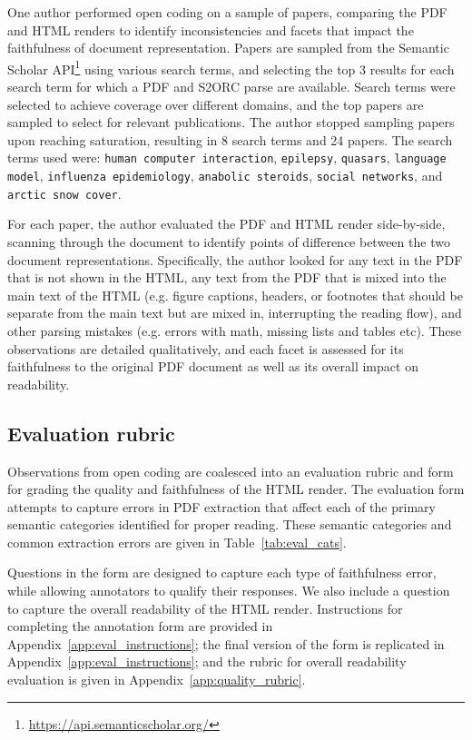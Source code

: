 One author performed open coding on a sample of papers, comparing the PDF and \scially HTML renders to identify inconsistencies and facets that impact the faithfulness of document representation. Papers are sampled from the Semantic Scholar API\footnote{\href{https://api.semanticscholar.org/}{https://api.semanticscholar.org/}} using various search terms, and selecting the top 3 results for each search term for which a PDF and S2ORC parse are available. Search terms were selected to achieve coverage over different domains, and the top papers are sampled to select for relevant publications. The author stopped sampling papers upon reaching saturation, resulting in 8 search terms and 24 papers. The search terms used were: \texttt{human computer interaction}, \texttt{epilepsy}, \texttt{quasars}, \texttt{language model}, \texttt{influenza epidemiology}, \texttt{anabolic steroids}, \texttt{social networks}, and \texttt{arctic snow cover}.

For each paper, the author evaluated the PDF and HTML render side-by-side, scanning through the document to identify points of difference between the two document representations. Specifically, the author looked for any text in the PDF that is not shown in the HTML, any text from the PDF that is mixed into the main text of the HTML (e.g. figure captions, headers, or footnotes that should be separate from the main text but are mixed in, interrupting the reading flow), and other parsing mistakes (e.g. errors with math, missing lists and tables etc). These observations are detailed qualitatively, and each facet is assessed for its faithfulness to the original PDF document as well as its overall impact on readability.

\subsection{Evaluation rubric}
\label{sec:eval_rubric}

Observations from open coding are coalesced into an evaluation rubric and form for grading the quality and faithfulness of the HTML render.
The evaluation form attempts to capture errors in PDF extraction that affect each of the primary semantic categories identified for proper reading. These semantic categories and common extraction errors are given in Table~\ref{tab:eval_cats}.

Questions in the form are designed to capture each type of faithfulness error, while allowing annotators to qualify their responses. We also include a question to capture the overall readability of the HTML render. Instructions for completing the annotation form are provided in Appendix~\ref{app:eval_instructions}; the final version of the form is replicated in Appendix~\ref{app:eval_instructions}; and the rubric for overall readability evaluation is given in Appendix~\ref{app:quality_rubric}. 

